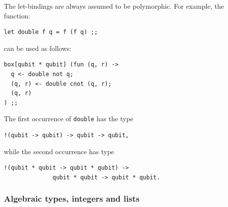 The let-bindings are always assumed to be polymorphic. For example, the 
function:
\begin{verbatim}
let double f q = f (f q) ;;
\end{verbatim}
can be used as follows:
\begin{verbatim}
box[qubit * qubit] (fun (q, r) ->
  q <- double not q;
  (q, r) <- double cnot (q, r);
  (q, r)
) ;;
\end{verbatim}
The first occurrence of \verb#double# has the type 
\begin{verbatim}
!(qubit -> qubit) -> qubit -> qubit,
\end{verbatim}
while the second occurrence has type 
\begin{verbatim}
!(qubit * qubit -> qubit * qubit) -> 
              qubit * qubit -> qubit * qubit.
\end{verbatim}

\subsubsection{Algebraic types, integers and lists}

